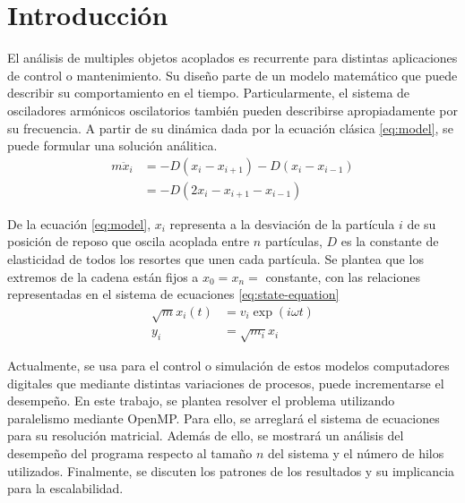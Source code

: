\section{Introducción}
El análisis de multiples objetos acoplados es recurrente para distintas aplicaciones de control o mantenimiento. Su diseño parte de un modelo matemático que puede describir su comportamiento en el tiempo. Particularmente, el sistema de osciladores armónicos oscilatorios también pueden describirse apropiadamente por su frecuencia. A partir de su dinámica dada por la ecuación clásica \ref{eq:model}, se puede formular una solución análitica.
\begin{equation}
	\begin{split}
		m \ddot x_i & = -D(x_i - x_{i+1}) - D(x_i - x_{i-1}) \\
		& = -D(2x_i - x_{i+1} - x_{i-1})         
	\end{split}
	\label{eq:model}
\end{equation}

De la ecuación \ref{eq:model}, $x_i$ representa a la desviación de la partícula $i$ de su posición de reposo que oscila acoplada entre $n$ partículas, $D$ es la constante de elasticidad de todos los resortes que unen cada partícula. Se plantea que los extremos de la cadena están fijos a $x_0 = x_n = $ constante, con las relaciones representadas en el sistema de ecuaciones \ref{eq:state-equation}
\begin{equation}
	\begin{split}
		\sqrt{m} x_i(t) &= v_i \exp(i \omega t) 
		\\
		y_i &= \sqrt{m_i}x_i 
	\end{split}
	\label{eq:state-equation}
\end{equation}

Actualmente, se usa para el control o simulación de estos modelos computadores digitales que mediante distintas variaciones de procesos, puede incrementarse el desempeño. En este trabajo, se plantea resolver el problema utilizando paralelismo mediante OpenMP. Para ello, se arreglará el sistema de ecuaciones para su resolución matricial. Además de ello, se mostrará un análisis del desempeño del programa respecto al tamaño $n$ del sistema y el número de hilos utilizados. Finalmente, se discuten los patrones de los resultados y su implicancia para la escalabilidad.



